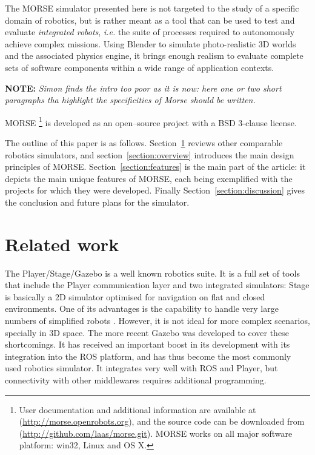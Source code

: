 \documentclass{llncs}
\newcommand{\NOTE}[1]{\textbf{NOTE:} \emph{#1} }
\begin{document}
The MORSE simulator presented here is not targeted to the study of a specific
domain of robotics, but is rather meant as a tool that can be used to test and
evaluate {\em integrated robots}, {\em i.e.} the suite of processes required to
autonomously achieve complex missions. Using Blender to simulate photo-realistic
3D worlds and the associated physics engine, it brings enough realism to evaluate
complete sets of software components within a wide range of application contexts.

\NOTE{Simon finds the intro too poor as it is now: here one or two short
  paragraphs tha highlight the specificities of Morse should be written.}

MORSE \footnote{User documentation and additional information are available at
(\url{http://morse.openrobots.org}), and the source code can be downloaded from
(\url{http://github.com/laas/morse.git}). MORSE works on all major
  software platform: win32, Linux and OS X.} is developed as an open--source project with a BSD 3-clause
license.

The outline of this paper is as follows. Section~\ref{section:othersims} reviews
other comparable robotics simulators, and section~\ref{section:overview}
introduces the main design principles of MORSE. Section~\ref{section:features}
is the main part of the article: it depicts the main unique features of MORSE,
each being exemplified with the projects for which they were developed. Finally
Section~\ref{section:discussion} gives the conclusion and future plans for the
simulator.

\section{Related work}
\label{section:othersims}

The Player/Stage/Gazebo\cite{psg-1232} is a well known robotics suite.
It is a full set of tools that include the Player communication layer
and two integrated simulators: Stage \cite{Gerkey03theplayer/stage} is basically a
2D simulator optimised for navigation on flat and closed environments.
One of its advantages is the capability to handle very large numbers of
simplified robots \cite{springerlink:10.1007/s11721-008-0014-4}. However, it is
not ideal for more complex scenarios, specially in 3D space. The more recent
Gazebo \cite{Koenig04designand} was developed to cover these shortcomings.
It has received an important boost in its development with its integration
into the ROS platform, and has thus become the most commonly used robotics
simulator. It integrates very well with ROS and Player, but connectivity with
other middlewares requires additional programming.
\end{document}
